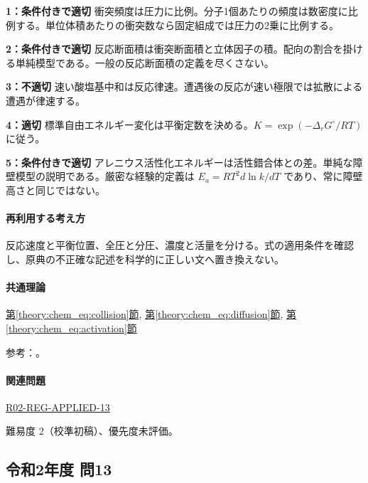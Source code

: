 \noindent\textbf{1：条件付きで適切} 衝突頻度は圧力に比例。分子1個あたりの頻度は数密度に比例する。単位体積あたりの衝突数なら固定組成では圧力の2乗に比例する。\par

\noindent\textbf{2：条件付きで適切} 反応断面積は衝突断面積と立体因子の積。配向の割合を掛ける単純模型である。一般の反応断面積の定義を尽くさない。\par

\noindent\textbf{3：不適切} 速い酸塩基中和は反応律速。遭遇後の反応が速い極限では拡散による遭遇が律速する。\par

\noindent\textbf{4：適切} 標準自由エネルギー変化は平衡定数を決める。\(K=\exp(-\Delta_rG^\circ/RT)\) に従う。\par

\noindent\textbf{5：条件付きで適切} アレニウス活性化エネルギーは活性錯合体との差。単純な障壁模型の説明である。厳密な経験的定義は \(E_a=RT^2d\ln k/dT\) であり、常に障壁高さと同じではない。\par

\paragraph{再利用する考え方} 反応速度と平衡位置、全圧と分圧、濃度と活量を分ける。式の適用条件を確認し、原典の不正確な記述を科学的に正しい文へ置き換えない。

\paragraph{共通理論} \hyperref[theory:chem_eq:collision]{第\ref*{theory:chem_eq:collision}節}, \hyperref[theory:chem_eq:diffusion]{第\ref*{theory:chem_eq:diffusion}節}, \hyperref[theory:chem_eq:activation]{第\ref*{theory:chem_eq:activation}節}

\par 参考：\cite{iupac_greenbook2012}。

\paragraph{関連問題} \hyperref[q:r02-reg-applied-13]{R02-REG-APPLIED-13}

\par 難易度 2（校準初稿）、優先度未評価。

\subsection{令和2年度 問13}
\label{q:r02-reg-applied-13}

